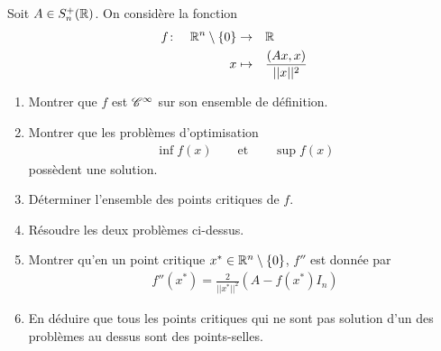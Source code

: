 \documentclass[french,a4paper,10pt]{article}
\begin{document}
	\begin{td-exo}[5]
		Soit $A\in S_n^+(\mathbb{R})$. On considère la fonction
			\[\begin{aligned}
				f&\colon&\mathbb{R}^n\setminus\{0\}&\to&&\mathbb{R}\\
				&&x&\mapsto&& \frac{(Ax,x)}{||x||^2}
			\end{aligned}\]
		
		\begin{enumerate}
			\item Montrer que $f$ est $\mathscr{C}^\infty$ sur son ensemble de définition.
			
			\item Montrer que les problèmes d'optimisation
			\[\begin{aligned}
				\inf f(x)\qquad\text{et}\qquad\sup f(x)
			\end{aligned}\]
			possèdent une solution.
			
			\item Déterminer l'ensemble des points critiques de $f$.
			
			\item Résoudre les deux problèmes ci-dessus.
			
			\item Montrer qu'en un point critique $x^\ast\in\mathbb{R}^n\setminus\{0\}$, $f''$ est donnée par
				\[\begin{aligned}
					f''(x^\ast)=\frac2{||x^\ast||^2}\left(A-f(x^\ast)I_n\right)
				\end{aligned}\]
				
			\item En déduire que tous les points critiques qui ne sont pas solution d'un des problèmes au dessus sont des points-selles.
		\end{enumerate}
			
	\end{td-exo}
	
\end{document}
